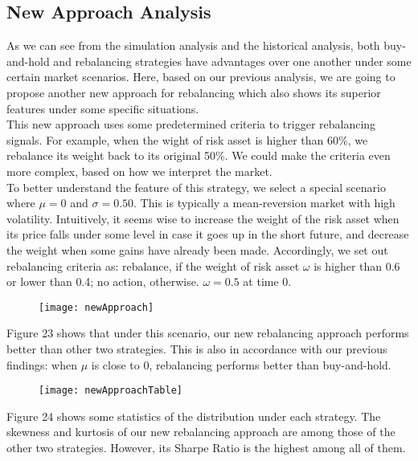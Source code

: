 \documentclass[
10pt, %
a4paper, %
oneside, %
headinclude,footinclude, %
BCOR5mm, %
]{scrartcl}
\begin{document}
\subsection{New Approach Analysis}
As we can see from the simulation analysis and the historical analysis, both buy-and-hold and rebalancing strategies have advantages over one another under some certain market scenarios. Here, based on our previous analysis, we are going to propose another new approach for rebalancing which also shows its superior features under some specific situations.\\

This new approach uses some predetermined criteria to trigger rebalancing signals. For example, when the wight of risk asset is higher than 60\%, we rebalance its weight back to its original 50\%. We could make the criteria even more complex, based on how we interpret the market.\\

To better understand the feature of this strategy, we select a special scenario where $\mu = 0$ and $\sigma = 0.50$. This is typically a mean-reversion market with high volatility. Intuitively, it seems wise to increase the weight of the risk asset when its price falls under some level in case it goes up in the short future, and decrease the weight when some gains have already been made. Accordingly, we set out rebalancing criteria as: rebalance, if the weight of risk asset $\omega$ is higher than 0.6 or lower than 0.4; no action, otherwise. $\omega = 0.5$ at time 0.\\


\begin{figure}[H]
	\centering
	\texttt{[image: newApproach]}
	\caption{}
	\label{fig:newapproach}
\end{figure}

Figure 23 shows that under this scenario, our new rebalancing approach performs better than other two strategies. This is also in accordance with our previous findings: when $\mu$ is close to 0, rebalancing performs better than buy-and-hold.\\

\begin{figure}[H]
	\centering
	\large
	\texttt{[image: newApproachTable]}
	\caption{}
	\label{fig:newapproachtable}
\end{figure}

Figure 24 shows some statistics of the distribution under each strategy. The skewness and kurtosis of our new rebalancing approach are among those of the other two strategies. However, its Sharpe Ratio is the highest among all of them.\\
\end{document}
